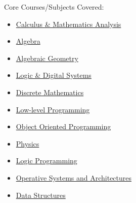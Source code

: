 \documentclass[10pt,a4paper,academicons]{altacv}
\begin{document}
{\small\faBook\hspace{0.5em}Core Courses/Subjects Covered:\begin{itemize}

\item \hspace{0.5em} \href{https://en.wikipedia.org/wiki/Calculus}{Calculus \& Mathematics Analysis}
\item \hspace{0.5em} \href{https://en.wikipedia.org/wiki/Algebra}{Algebra}
\item \hspace{0.5em} \href{https://en.wikipedia.org/wiki/Algebraic_geometry}{Algebraic Geometry}
\item \hspace{0.5em} \href{https://en.wikipedia.org/wiki/Digital_electronics}{Logic \& Digital Systems}
\item \hspace{0.5em} \href{https://en.wikipedia.org/wiki/Discrete_mathematics}{Discrete Mathematics}
\item \hspace{0.5em} \href{https://en.wikipedia.org/wiki/Low-level_programming_language}{Low-level Programming}
\item \hspace{0.5em} \href{https://en.wikipedia.org/wiki/Object-oriented_programming}{Object Oriented Programming}
\item \hspace{0.5em} \href{https://en.wikipedia.org/wiki/Physics}{Physics}
\item \hspace{0.5em} \href{https://en.wikipedia.org/wiki/Logic_programming}{Logic Programming}
\item \hspace{0.5em} \href{https://en.wikipedia.org/wiki/Operating_system}{Operative Systems and Architectures}
\item \hspace{0.5em} \href{https://en.wikipedia.org/wiki/Data_structure}{Data Structures}

\end{itemize}}
\end{document}
